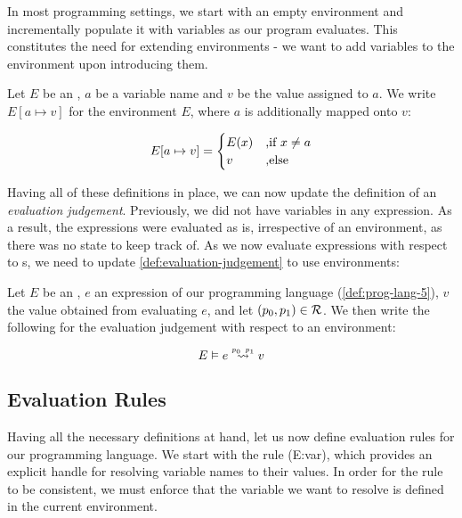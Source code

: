 In most programming settings, we start with an empty environment and incrementally populate it with variables as our program evaluates. This constitutes the need for extending environments - we want to add variables to the environment upon introducing them.

\begin{definition}\label{def:environment-augment}	
   Let \(E\) be an , \(a\) be a variable name and \(v\) be the value assigned to \(a\). We write \(E[a \mapsto v]\) for the environment \(E\), where \(a\) is additionally mapped onto \(v\):

   \[
      E[a \mapsto v] = 
      \begin{cases}
	 E(x)  & \mbox{,if } x \neq a\\
	 v     & \mbox{,else } 
      \end{cases}
   \]

\end{definition}

Having all of these definitions in place, we can now update the definition of an \emph{evaluation judgement}. Previously, we did not have variables in any expression. As a result, the expressions were evaluated as is, irrespective of an environment, as there was no state to keep track of. As we now evaluate expressions with respect to s, we need to update \cref{def:evaluation-judgement} to use environments:

\begin{definition}\label{def:eval-judgement-environments}
   Let \(E\) be an , \(e\) an expression of our programming language (\cref{def:prog-lang-5}), \(v\) the value obtained from evaluating \(e\), and let \((p_0, p_1) \in \mathcal{R}\). We then write the following for the evaluation judgement with respect to an environment:

   \[
      \evals{E}{e}{v}{p_0}{p_1}
   \]
	
\end{definition}

\subsection{Evaluation Rules}

Having all the necessary definitions at hand, let us now define evaluation rules for our programming language. We start with the rule (E:var), which provides an explicit handle for resolving variable names to their values. In order for the rule to be consistent, we must enforce that the variable we want to resolve is defined in the current environment. 

